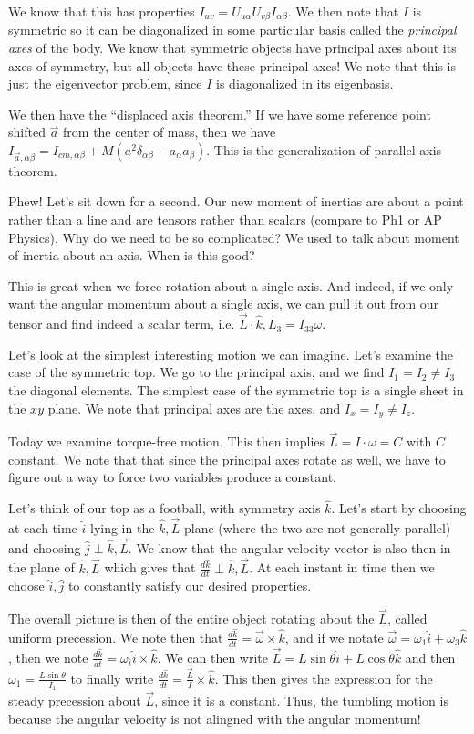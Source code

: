\documentclass[10pt]{report}
\newcommand{\rd}[2]{\frac{d#1}{d#2}}
\begin{document}
We know that this has properties $I_{uv} = U_{u\alpha}U_{v\beta}I_{\alpha\beta}$. We then note that $I$ is symmetric so it can be diagonalized in some particular basis called the \emph{principal axes} of the body. We know that symmetric objects have principal axes about its axes of symmetry, but all objects have these principal axes! We note that this is just the eigenvector problem, since $I$ is diagonalized in its eigenbasis.

We then have the ``displaced axis theorem.'' If we have some reference point shifted $\vec{a}$ from the center of mass, then we have $I_{\vec{a},\alpha\beta} = I_{cm,\alpha\beta} + M\left( a^2 \delta_{\alpha\beta} - a_\alpha a_\beta \right)$. This is the generalization of parallel axis theorem.

Phew! Let's sit down for a second. Our new moment of inertias are about a point rather than a line and are tensors rather than scalars (compare to Ph1 or AP Physics). Why do we need to be so complicated? We used to talk about moment of inertia about an axis. When is this good? 

This is great when we force rotation about a single axis. And indeed, if we only want the angular momentum about a single axis, we can pull it out from our tensor and find indeed a scalar term, i.e. $\vec{L}\cdot \hat{k}, L_3 = I_{33}\omega$.

Let's look at the simplest interesting motion we can imagine. Let's examine the case of the symmetric top. We go to the principal axis, and we find $I_1 = I_2 \neq I_3$ the diagonal elements. The simplest case of the symmetric top is a single sheet in the $xy$ plane. We note that principal axes are the axes, and $I_x = I_y \neq I_z$. 

Today we examine torque-free motion. This then implies $\vec{L} = I \cdot \omega = C$ with $C$ constant. We note that that since the principal axes rotate as well, we have to figure out a way to force two variables produce a constant. 

Let's think of our top as a football, with symmetry axis $\hat{k}$. Let's start by choosing at each time $\hat{i}$ lying in the $\hat{k},\vec{L}$ plane (where the two are not generally parallel) and choosing $\hat{j} \perp \hat{k},\vec{L}$. We know that the angular velocity vector is also then in the plane of $\hat{k},\vec{L}$ which gives that $\rd{\hat{k}}{t}\perp \hat{k},\vec{L}$. At each instant in time then we choose $\hat{i},\hat{j}$ to constantly satisfy our desired properties.

The overall picture is then of the entire object rotating about the $\vec{L}$, called uniform precession. We note then that $\rd{\hat{k}}{t} = \vec{\omega}\times \hat{k}$, and if we notate $\vec{\omega} = \omega_1 \hat{i} + \omega_3 \hat{k}$, then we note $\rd{\hat{k}}{t} = \omega_i \hat{i}\times \hat{k}$. We can then write $\vec{L} = L\sin \theta\hat{i} + L\cos \theta\hat{k}$ and then $\omega_1 = \frac{L\sin\theta}{I_1}$ to finally write $\rd{\hat{k}}{t} = \frac{\vec{L}}{I}\times \hat{k}$. This then gives the expression for the steady precession about $\vec{L}$, since it is a constant. Thus, the tumbling motion is because the angular velocity is not alingned with the angular momentum! 
\end{document}
